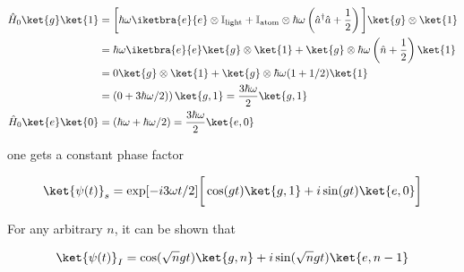 \begin{equation}
  \begin{aligned}
    \hat{H}_0\ket{g}\ket{1} & = \bigg[\hbar\omega\iketbra{e}{e}\otimes\mathbb{I}_\text{light} + \mathbb{I}_\text{atom}\otimes \hbar\omega\left(\hat{a}^\dagger\hat{a}+\frac{1}{2}\right)\bigg]\ket{g}\otimes\ket{1}  \\
    & = \hbar\omega\iketbra{e}{e}\ket{g} \otimes \ket{1} + \ket{g}\otimes \hbar\omega\left(\hat{n}+\frac{1}{2}\right)\ket{1}\\
    & = 0  \ket{g} \otimes\ket{1} + \ket{g} \otimes \hbar\omega(1+1/2)\ket{1}\\
    & = \left(0+3\hbar\omega/2)\right)\ket{g,1} = \frac{3\hbar\omega}{2}\ket{g,1}\\
    \hat{H}_0\ket{e}\ket{0}   &  =   (\hbar\omega  +   \hbar\omega/2)  =
    \frac{3\hbar\omega}{2}\ket{e,0}
  \end{aligned}
\end{equation}

\noindent one gets a constant phase factor

\textcolor{red}{\begin{equation}   \ket{\psi(t)}_s    =   \exp[-i3\omega
    t/2]\bigg[\cos(gt)\ket{g,1}+i\sin(gt)\ket{e,0}\bigg]
  \end{equation}}

\noindent For any arbitrary $n$, it can be shown that

\textcolor{red}{\begin{equation}            \ket{\psi(t)}_I            =
    \cos(\sqrt{n}gt)\ket{g,n}+i\sin(\sqrt{n}gt)\ket{e,n-1}
  \end{equation}}

\newpage

